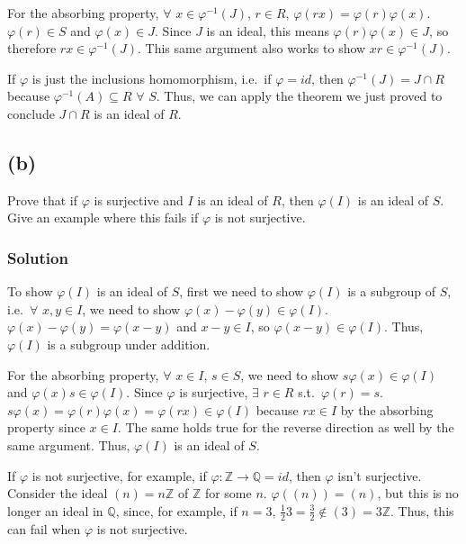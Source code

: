 \documentclass[fleqn]{article}
\begin{document}
            For the absorbing property, $\forall$ $x \in \varphi^{-1}(J)$, $r \in R$, $\varphi(rx) = \varphi(r) \varphi(x)$.  $\varphi(r) \in S$ and $\varphi(x) \in J$.  Since $J$ is an ideal, this means $\varphi(r) \varphi(x) \in J$, so therefore $rx \in \varphi^{-1}(J)$.  This same argument also works to show $xr \in \varphi^{-1}(J)$.
            
            If $\varphi$ is just the inclusions homomorphism, i.e.\ if $\varphi = id$, then $\varphi^{-1}(J) = J \cap R$ because $\varphi^{-1}(A) \subseteq R$ $\forall$ $S$.  Thus, we can apply the theorem we just proved to conclude $J \cap R$ is an ideal of $R$.
        
        \subsection{(b)}
        Prove that if $\varphi$ is surjective and $I$ is an ideal of $R$, then $\varphi(I)$ is an ideal of $S$.  Give an example where this fails if $\varphi$ is not surjective.
        
            \subsubsection{Solution}
            To show $\varphi(I)$ is an ideal of $S$, first we need to show $\varphi(I)$ is a subgroup of $S$, i.e.\ $\forall$ $x, y \in I$, we need to show $\varphi(x) - \varphi(y) \in \varphi(I)$.  $\varphi(x) - \varphi(y) = \varphi(x - y)$ and $x - y \in I$, so $\varphi(x - y) \in \varphi(I)$.  Thus, $\varphi(I)$ is a subgroup under addition.
            
            For the absorbing property, $\forall$ $x \in I$, $s \in S$, we need to show $s\varphi(x) \in \varphi(I)$ and $\varphi(x)s \in \varphi(I)$.  Since $\varphi$ is surjective, $\exists$ $r \in R$ s.t.\ $\varphi(r) = s$.  $s\varphi(x) = \varphi(r)\varphi(x) = \varphi(rx) \in \varphi(I)$ because $rx \in I$ by the absorbing property since $x \in I$.  The same holds true for the reverse direction as well by the same argument.  Thus, $\varphi(I)$ is an ideal of $S$.
            
            If $\varphi$ is not surjective, for example, if $\varphi: \mathbb{Z} \to \mathbb{Q} = id$, then $\varphi$ isn't surjective.  Consider the ideal $(n) = n\mathbb{Z}$ of $\mathbb{Z}$ for some $n$.  $\varphi((n)) = (n)$, but this is no longer an ideal in $\mathbb{Q}$, since, for example, if $n = 3$, $\frac{1}{2} 3 = \frac{3}{2} \notin (3) = 3 \mathbb{Z}$.  Thus, this can fail when $\varphi$ is not surjective.
    
\end{document}
